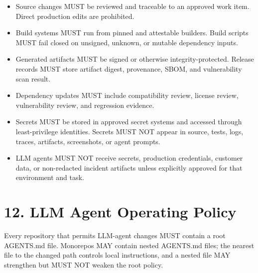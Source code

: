 \documentclass[11pt]{article}
\begin{document}
\begin{itemize}
  \item Source changes MUST be reviewed and traceable to an approved work item. Direct production edits are prohibited.
  \item Build systems MUST run from pinned and attestable builders. Build scripts MUST fail closed on unsigned, unknown, or mutable dependency inputs.
  \item Generated artifacts MUST be signed or otherwise integrity-protected. Release records MUST store artifact digest, provenance, SBOM, and vulnerability scan result.
  \item Dependency updates MUST include compatibility review, license review, vulnerability review, and regression evidence.
  \item Secrets MUST be stored in approved secret systems and accessed through least-privilege identities. Secrets MUST NOT appear in source, tests, logs, traces, artifacts, screenshots, or agent prompts.
  \item LLM agents MUST NOT receive secrets, production credentials, customer data, or non-redacted incident artifacts unless explicitly approved for that environment and task.
\end{itemize}

\hypertarget{sec-llm-agent-policy}{}
\section*{12. LLM Agent Operating Policy}
Every repository that permits LLM-agent changes MUST contain a root AGENTS.md file. Monorepos MAY contain nested AGENTS.md files; the nearest file to the changed path controls local instructions, and a nested file MAY strengthen but MUST NOT weaken the root policy.
\end{document}
